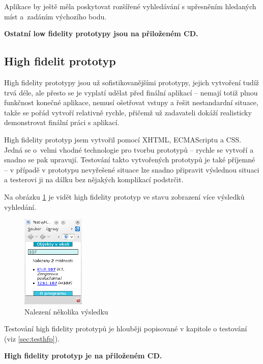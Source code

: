 Aplikace by ještě měla poskytovat rozšířené vyhledávání s upřesněním hledaných míst a~zadáním výchozího bodu.

\noindent\textbf{Ostatní low fidelity prototypy jsou na přiloženém CD.}



\subsection{High fidelit prototyp}
High fidelity prototypy jsou už sofistikovanějšími prototypy, jejich vytvoření tudíž trvá déle, ale přesto se je vyplatí udělat před finální aplikací -- nemají totiž plnou funkčnost konečné aplikace, nemusí ošetřovat vstupy a řešit nestandardní situace, takže se pořád vytvoří relativně rychle, přičemž už zadavateli dokáží realisticky demonstrovat finální práci s aplikací.

High fidelity prototyp jsem vytvořil pomocí XHTML, ECMAScriptu a CSS. Jedná se o~velmi vhodné technologie pro tvorbu prototypů -- rychle se vytvoří a snadno se pak upravují. Testování takto vytvořených prototypů je také příjemné -- v případě v prototypu nevyřešené situace lze snadno připravit výslednou situaci a testerovi ji na dálku bez nějakých komplikací podstrčit.

Na obrázku \ref{fig:HFviceVysledku} je vidět high fidelity prototyp ve stavu zobrazení více výsledků vyhledání.

\begin{figure}[ht]
\begin{center}
\includegraphics[width=30mm]{figures/HFviceVysledku}
\caption{Nalezení několika výsledku}
\label{fig:HFviceVysledku}
\end{center}
\end{figure}

Testování high fidelity prototypů je hlouběji popisované v kapitole o testování (viz \ref{sec:testhfp}).

\noindent\textbf{High fidelity prototyp je na přiloženém CD.}




